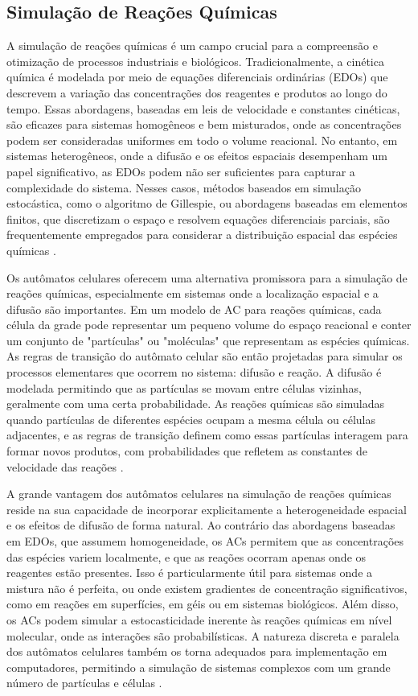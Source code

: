 \documentclass[12pt,oneside]{report}
\begin{document}
\subsection{Simulação de Reações Químicas}

A simulação de reações químicas é um campo crucial para a compreensão e otimização de processos industriais e biológicos. Tradicionalmente, a cinética química é modelada por meio de equações diferenciais ordinárias (EDOs) que descrevem a variação das concentrações dos reagentes e produtos ao longo do tempo. Essas abordagens, baseadas em leis de velocidade e constantes cinéticas, são eficazes para sistemas homogêneos e bem misturados, onde as concentrações podem ser consideradas uniformes em todo o volume reacional. No entanto, em sistemas heterogêneos, onde a difusão e os efeitos espaciais desempenham um papel significativo, as EDOs podem não ser suficientes para capturar a complexidade do sistema. Nesses casos, métodos baseados em simulação estocástica, como o algoritmo de Gillespie, ou abordagens baseadas em elementos finitos, que discretizam o espaço e resolvem equações diferenciais parciais, são frequentemente empregados para considerar a distribuição espacial das espécies químicas \cite{Gillespie1977}.

Os autômatos celulares oferecem uma alternativa promissora para a simulação de reações químicas, especialmente em sistemas onde a localização espacial e a difusão são importantes. Em um modelo de AC para reações químicas, cada célula da grade pode representar um pequeno volume do espaço reacional e conter um conjunto de "partículas" ou "moléculas" que representam as espécies químicas. As regras de transição do autômato celular são então projetadas para simular os processos elementares que ocorrem no sistema: difusão e reação. A difusão é modelada permitindo que as partículas se movam entre células vizinhas, geralmente com uma certa probabilidade. As reações químicas são simuladas quando partículas de diferentes espécies ocupam a mesma célula ou células adjacentes, e as regras de transição definem como essas partículas interagem para formar novos produtos, com probabilidades que refletem as constantes de velocidade das reações \cite{kier2005}.

A grande vantagem dos autômatos celulares na simulação de reações químicas reside na sua capacidade de incorporar explicitamente a heterogeneidade espacial e os efeitos de difusão de forma natural. Ao contrário das abordagens baseadas em EDOs, que assumem homogeneidade, os ACs permitem que as concentrações das espécies variem localmente, e que as reações ocorram apenas onde os reagentes estão presentes. Isso é particularmente útil para sistemas onde a mistura não é perfeita, ou onde existem gradientes de concentração significativos, como em reações em superfícies, em géis ou em sistemas biológicos. Além disso, os ACs podem simular a estocasticidade inerente às reações químicas em nível molecular, onde as interações são probabilísticas. A natureza discreta e paralela dos autômatos celulares também os torna adequados para implementação em computadores, permitindo a simulação de sistemas complexos com um grande número de partículas e células \cite{kier2005}.
\end{document}
